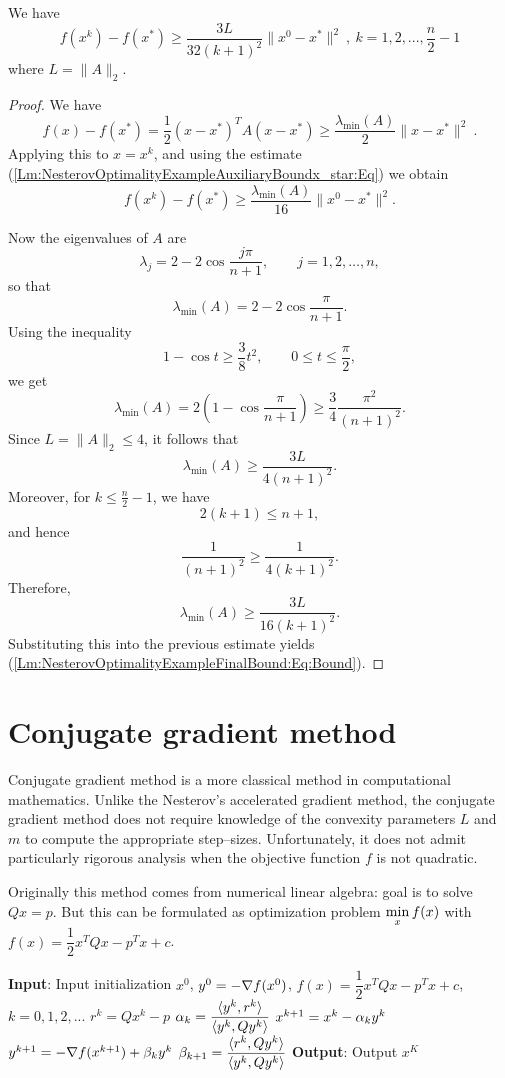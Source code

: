 \begin{lemma}\label{Lm:NesterovOptimalityExampleFinalBound}
We have 
\begin{equation}\label{Lm:NesterovOptimalityExampleFinalBound:Eq:Bound}
f(x^k)-f(x^*)\geq \dfrac{3L}{32(k+1)^2}\|x^0-x^*\|^2 \
 , \ k=1,2,...,\dfrac{n}{2}-1
\end{equation}
where $L=\|A\|_2$. 
\end{lemma}

\begin{proof}
We have 
$$
f(x)-f(x^*)
=\frac12 (x-x^*)^T A(x-x^*)
\ge \frac{\lambda_{\min}(A)}{2}\|x-x^*\|^2 \ .
$$
Applying this to \(x=x^k\), and using the estimate (\ref{Lm:NesterovOptimalityExampleAuxiliaryBoundx_star:Eq}) we obtain
\[
f(x^k)-f(x^*)
\ge \frac{\lambda_{\min}(A)}{16}\|x^0-x^*\|^2.
\]

Now the eigenvalues of \(A\) are
\[
\lambda_j=2-2\cos\frac{j\pi}{n+1},
\qquad j=1,2,\dots,n,
\]
so that
\[
\lambda_{\min}(A)=2-2\cos\frac{\pi}{n+1}.
\]
Using the inequality
\[
1-\cos t \ge \frac{3}{8}t^2,
\qquad 0\le t\le \frac{\pi}{2},
\]
we get
\[
\lambda_{\min}(A)
=2\left(1-\cos\frac{\pi}{n+1}\right)
\ge \frac34\frac{\pi^2}{(n+1)^2}.
\]
Since \(L=\|A\|_2\le 4\), it follows that
\[
\lambda_{\min}(A)\ge \frac{3L}{4(n+1)^2}.
\]
Moreover, for \(k\le \frac n2-1\), we have
\[
2(k+1)\le n+1,
\]
and hence
\[
\frac{1}{(n+1)^2}\ge \frac{1}{4(k+1)^2}.
\]
Therefore,
\[
\lambda_{\min}(A)\ge \frac{3L}{16(k+1)^2}.
\]
Substituting this into the previous estimate yields (\ref{Lm:NesterovOptimalityExampleFinalBound:Eq:Bound}).
\end{proof}

\section{Conjugate gradient method}

Conjugate gradient method is a more classical method in computational mathematics.
Unlike the Nesterov's accelerated gradient method, the conjugate gradient method does not require
knowledge of the convexity parameters $L$ and $m$ to compute the appropriate step--sizes.
Unfortunately, it does not admit particularly rigorous analysis when the objective function $f$ is not quadratic.

Originally this method comes from numerical linear algebra: goal is to solve $Qx=p$. But this can be formulated as
optimization problem $\min\limits_{x} f(x)$ with $f(x)=\dfrac{1}{2}x^TQx-p^Tx+c$.

\begin{algorithm}[H]
\caption{Conjugate Gradient Method}
\label{Alg:ConjugateGradient}
\begin{algorithmic}[1]
\STATE \textbf{Input}: Input initialization $x^0$, $y^0=-\nabla f(x^0)$, $f(x)=\dfrac{1}{2}x^TQx-p^Tx+c$, $k=0,1,2,...$
\FOR {$k=0,1,2,...,K-1$}
    \STATE $r^k=Qx^k-p$
    \STATE $\alpha_k=\dfrac{\langle y^k, r^k\rangle }{\langle y^k, Q y^k\rangle}$
    \STATE $x^{k+1}=x^k-\alpha_k y^k$
    \STATE $y^{k+1}=-\nabla f(x^{k+1})+ \beta_{k} y^{k}$
    \STATE $\beta_{k+1}=\dfrac{\langle r^{k}, Qy^{k}\rangle}{\langle y^{k}, Qy^{k}\rangle}$
\ENDFOR
\STATE \textbf{Output}: Output $x^K$
\end{algorithmic}
\end{algorithm}

